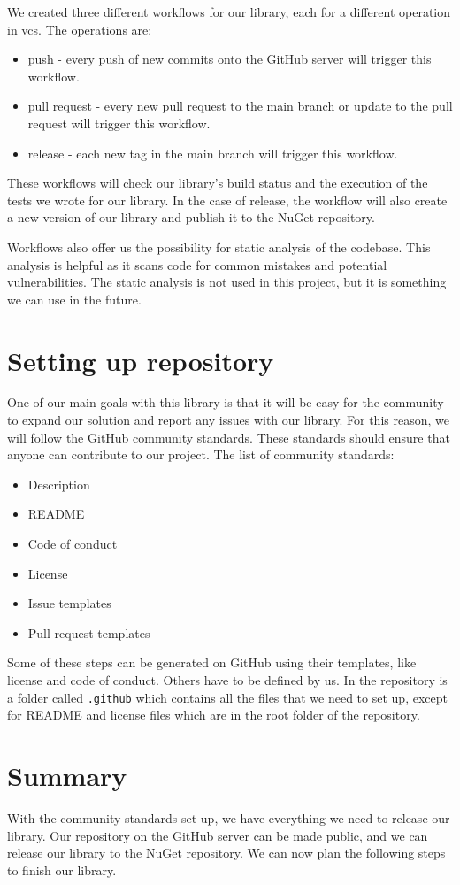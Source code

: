 We created three different workflows for our library, each for a different operation in \acrshort{vcs}. The operations are:
\begin{itemize}
    \item push - every push of new commits onto the GitHub server will trigger this workflow.
    \item pull request - every new pull request to the main branch or update to the pull request will trigger this workflow.
    \item release - each new tag in the main branch will trigger this workflow.
\end{itemize}
These workflows will check our library's build status and the execution of the tests we wrote for our library.
In the case of release, the workflow will also create a new version of our library and publish it to the NuGet repository.

Workflows also offer us the possibility for static analysis of the codebase. This analysis is helpful as it scans code for common mistakes and potential vulnerabilities.
The static analysis is not used in this project, but it is something we can use in the future.

\section{Setting up repository}

One of our main goals with this library is that it will be easy for the community to expand our solution and report any issues with our library.
For this reason, we will follow the GitHub community standards. These standards should ensure that anyone can contribute to our project.
The list of community standards:
\begin{itemize}
    \item {Description}
    \item {README}
    \item {Code of conduct}
    \item {License}
    \item {Issue templates}
    \item {Pull request templates}
\end{itemize}

Some of these steps can be generated on GitHub using their templates, like license and code of conduct.
Others have to be defined by us. In the repository is a folder called \texttt{.github} which contains all the files that we need to set up, except for README and license files which are in the root folder of the repository.

\section{Summary}

With the community standards set up, we have everything we need to release our library.
Our repository on the GitHub server can be made public, and we can release our library to the NuGet repository.
We can now plan the following steps to finish our library.
